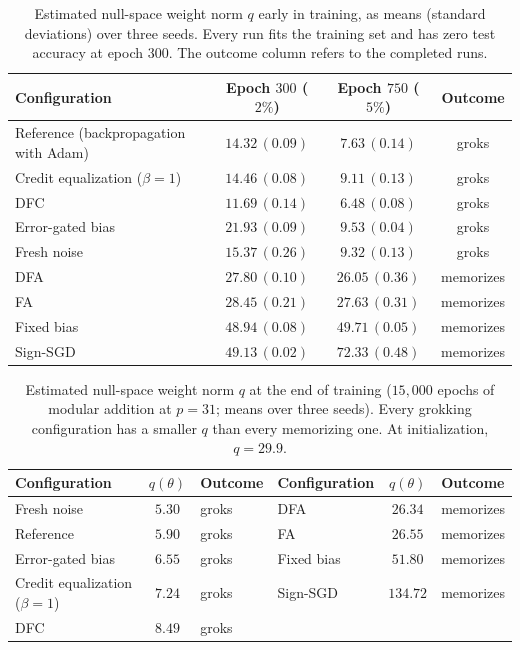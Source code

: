 \documentclass{article} %
\begin{document}
\begin{table}[!ht]
\caption{Estimated null-space weight norm $q$ early in training, as means (standard deviations) over three seeds. Every run fits the training set and has zero test accuracy at epoch $300$. The outcome column refers to the completed runs.}
\label{tab:early_flatmass}
\begin{center}
\small
\begin{tabular}{lccc}
\toprule
Configuration & Epoch $300$ ($2\%$) & Epoch $750$ ($5\%$) & Outcome \\
\midrule
Reference (backpropagation with Adam) & $14.32\,(0.09)$ & $7.63\,(0.14)$ & groks \\
Credit equalization ($\beta{=}1$) & $14.46\,(0.08)$ & $9.11\,(0.13)$ & groks \\
DFC & $11.69\,(0.14)$ & $6.48\,(0.08)$ & groks \\
Error-gated bias & $21.93\,(0.09)$ & $9.53\,(0.04)$ & groks \\
Fresh noise & $15.37\,(0.26)$ & $9.32\,(0.13)$ & groks \\
DFA & $27.80\,(0.10)$ & $26.05\,(0.36)$ & memorizes \\
FA & $28.45\,(0.21)$ & $27.63\,(0.31)$ & memorizes \\
Fixed bias & $48.94\,(0.08)$ & $49.71\,(0.05)$ & memorizes \\
Sign-SGD & $49.13\,(0.02)$ & $72.33\,(0.48)$ & memorizes \\
\bottomrule
\end{tabular}
\end{center}
\end{table}

\begin{table}[!ht]
\caption{Estimated null-space weight norm $q$ at the end of training ($15{,}000$ epochs of modular addition at $p=31$; means over three seeds). Every grokking configuration has a smaller $q$ than every memorizing one. At initialization, $q = 29.9$.}
\label{tab:flatmass}
\begin{center}
\small
\begin{tabular}{lcllcl}
\toprule
Configuration & $q(\theta)$ & Outcome & Configuration & $q(\theta)$ & Outcome \\
\midrule
Fresh noise & $5.30$ & groks & DFA & $26.34$ & memorizes \\
Reference & $5.90$ & groks & FA & $26.55$ & memorizes \\
Error-gated bias & $6.55$ & groks & Fixed bias & $51.80$ & memorizes \\
Credit equalization ($\beta{=}1$) & $7.24$ & groks & Sign-SGD & $134.72$ & memorizes \\
DFC & $8.49$ & groks & & & \\
\bottomrule
\end{tabular}
\end{center}
\end{table}
\end{document}
